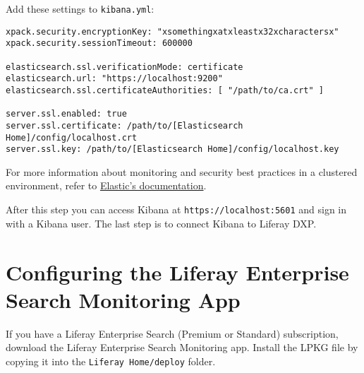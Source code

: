 Add these settings to \texttt{kibana.yml}:

\begin{verbatim}
xpack.security.encryptionKey: "xsomethingxatxleastx32xcharactersx"
xpack.security.sessionTimeout: 600000

elasticsearch.ssl.verificationMode: certificate
elasticsearch.url: "https://localhost:9200"
elasticsearch.ssl.certificateAuthorities: [ "/path/to/ca.crt" ]

server.ssl.enabled: true
server.ssl.certificate: /path/to/[Elasticsearch Home]/config/localhost.crt
server.ssl.key: /path/to/[Elasticsearch Home]/config/localhost.key
\end{verbatim}

For more information about monitoring and security best practices in a
clustered environment, refer to
\href{https://www.elastic.co/guide/en/x-pack/6.5/secure-monitoring.html}{Elastic's
documentation}.

After this step you can access Kibana at \texttt{https://localhost:5601}
and sign in with a Kibana user. The last step is to connect Kibana to
Liferay DXP.

\section{Configuring the Liferay Enterprise Search Monitoring
App}\label{configuring-the-liferay-enterprise-search-monitoring-app}

If you have a Liferay Enterprise Search (Premium or Standard)
subscription, download the Liferay Enterprise Search Monitoring app.
Install the LPKG file by copying it into the
\texttt{Liferay\ Home/deploy} folder.

